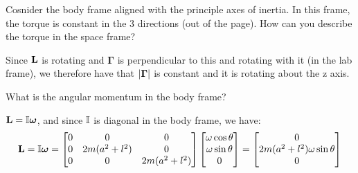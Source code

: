 \documentclass[../PHYS306Notes.tex]{subfiles}
\begin{document}
Cosnider the body frame aligned with the principle axes of inertia.  In this frame, the torque is constant in the 3 directions (out of the page). How can you describe the torque in the space frame?
\begin{s}
Since $\mathbf{L}$ is rotating and $\bm{\Gamma}$ is perpendicular to this and rotating with it (in the lab frame), we therefore have that $\abs{\bm{\Gamma}}$ is constant and it is rotating about the z axis.
\end{s}
What is the angular momentum in the body frame?
\begin{s}
$\mathbf{L} = \mathbb{I}\bm{\omega}$, and since $\mathbb{I}$ is diagonal in the body frame, we have:
\[\mathbf{L} = \mathbb{I}\bm{\omega} = \begin{bmatrix}0 & 0 & 0 \\ 0 & 2m(a^2+l^2) & 0 \\ 0 & 0 & 2m(a^2 + l^2)\end{bmatrix}\begin{bmatrix}\omega\cos\theta \\ \omega\sin\theta \\ 0\end{bmatrix} = \begin{bmatrix}0 \\ 2m(a^2+l^2)\omega\sin\theta \\ 0\end{bmatrix}\]
\end{s}
\end{document}
